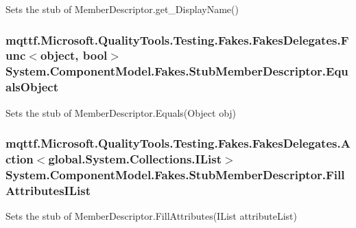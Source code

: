 Sets the stub of Member\-Descriptor.\-get\-\_\-\-Display\-Name()

\hypertarget{class_system_1_1_component_model_1_1_fakes_1_1_stub_member_descriptor_aab5f312f3e17030a0bf0b8d91a3f68f7}{
\subsubsection[{Equals\-Object}]{\setlength{\rightskip}{0pt plus 5cm}mqttf.\-Microsoft.\-Quality\-Tools.\-Testing.\-Fakes.\-Fakes\-Delegates.\-Func$<$object, bool$>$ System.\-Component\-Model.\-Fakes.\-Stub\-Member\-Descriptor.\-Equals\-Object}}\label{class_system_1_1_component_model_1_1_fakes_1_1_stub_member_descriptor_aab5f312f3e17030a0bf0b8d91a3f68f7}


Sets the stub of Member\-Descriptor.\-Equals(\-Object obj)

\hypertarget{class_system_1_1_component_model_1_1_fakes_1_1_stub_member_descriptor_a0abca3503fab88aa8cd102f36971d121}{
\subsubsection[{Fill\-Attributes\-I\-List}]{\setlength{\rightskip}{0pt plus 5cm}mqttf.\-Microsoft.\-Quality\-Tools.\-Testing.\-Fakes.\-Fakes\-Delegates.\-Action$<$global.\-System.\-Collections.\-I\-List$>$ System.\-Component\-Model.\-Fakes.\-Stub\-Member\-Descriptor.\-Fill\-Attributes\-I\-List}}\label{class_system_1_1_component_model_1_1_fakes_1_1_stub_member_descriptor_a0abca3503fab88aa8cd102f36971d121}


Sets the stub of Member\-Descriptor.\-Fill\-Attributes(\-I\-List attribute\-List)

